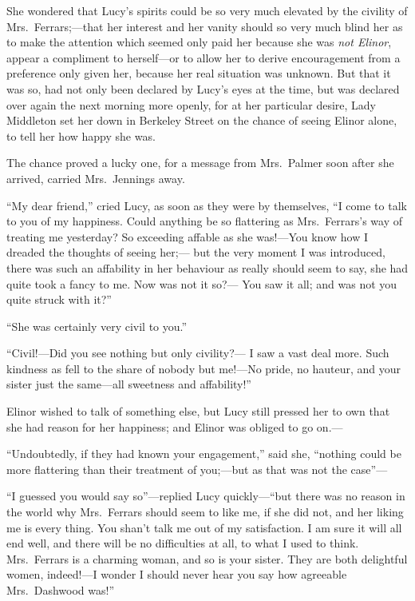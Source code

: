 She wondered that Lucy's spirits could be so very much
elevated by the civility of Mrs.\ Ferrars;---that her interest
and her vanity should so very much blind her as to make
the attention which seemed only paid her because she was
\emph{not Elinor}, appear a compliment to herself---or to allow
her to derive encouragement from a preference only given her,
because her real situation was unknown.  But that it was so,
had not only been declared by Lucy's eyes at the time,
but was declared over again the next morning more openly,
for at her particular desire, Lady Middleton set her down
in Berkeley Street on the chance of seeing Elinor alone,
to tell her how happy she was.

The chance proved a lucky one, for a message from
Mrs.\ Palmer soon after she arrived, carried Mrs.\ Jennings away.

``My dear friend,'' cried Lucy, as soon as they were
by themselves, ``I come to talk to you of my happiness.
Could anything be so flattering as Mrs.\ Ferrars's way
of treating me yesterday?  So exceeding affable as she
was!---You know how I dreaded the thoughts of seeing her;---%
but the very moment I was introduced, there was such an
affability in her behaviour as really should seem to say,
she had quite took a fancy to me.  Now was not it so?---%
You saw it all; and was not you quite struck with it?''

``She was certainly very civil to you.''

``Civil!---Did you see nothing but only civility?---%
I saw a vast deal more.  Such kindness as fell to the share
of nobody but me!---No pride, no hauteur, and your sister
just the same---all sweetness and affability!''

Elinor wished to talk of something else, but Lucy still
pressed her to own that she had reason for her happiness;
and Elinor was obliged to go on.---%

``Undoubtedly, if they had known your engagement,''
said she, ``nothing could be more flattering than their
treatment of you;---but as that was not the case''---%

``I guessed you would say so''---replied Lucy
quickly---``but there was no reason in the world why
Mrs.\ Ferrars should seem to like me, if she did not,
and her liking me is every thing.  You shan't talk me
out of my satisfaction.  I am sure it will all end well,
and there will be no difficulties at all, to what I
used to think.  Mrs.\ Ferrars is a charming woman,
and so is your sister.  They are both delightful women,
indeed!---I wonder I should never hear you say how agreeable
Mrs.\ Dashwood was!''

